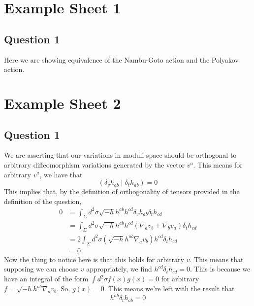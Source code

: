 \documentclass[11pt, oneside]{article}   	%
\theoremstyle{slanted}
\begin{document}
\section*{Example Sheet 1}

\subsection{Question 1}
Here we are showing equivalence 
of the Nambu-Goto action and the Polyakov action.
 

\pagebreak

\section{Example Sheet 2}

\subsection{Question 1}
We are asserting that 
our variations in moduli space should 
be orthogonal to arbitrary diffeomorphism 
variations generated by the vector $ v^ a  $. 
This means for arbitrary $ v ^ a  $, we 
have that 
\[
 \left( \delta _ v h _{ ab } \mid \delta _ t h _{ ab }  \right)   = 0
\] This implies that, by the definition of 
orthogonality of tensors provided in the definition of 
the question, 
\begin{align*}
	0 &=  \int_{ \Sigma } d ^ 2 \sigma \sqrt{ - h }  
	h ^{ ab } h ^{ cd } \delta _ v h _{ ab } \delta _ t h _{ cd} \\
	&=  \int_{ \Sigma } d ^ 2 \sigma \sqrt{ - h}  
	h ^{ ab } h ^{ cd } \left( \nabla _ a v _ b 
	+ \nabla _ b v _  a  \right)  \delta _ t h _{ cd } \\
	&=  2 \int _{ \Sigma  } d ^ 2 \sigma \left( 
	\sqrt{ -h }  h ^{ ab } \nabla _ a v _ b \right)  h ^{ cd } 
	\delta _ t h _{ cd }  \\
	&=  0 
\end{align*}
Now the thing to notice here is that 
this holds for arbitrary $ v $. This means that 
supposing we can choose $ v $ appropriately, we find 
$ h ^{ cd } \delta _ t h _{ cd } = 0 $.
This is because we have an integral 
of the form $ \int d ^ 2 \sigma f \left(  x  \right)  g \left( x  \right)    =0   $ 
for arbitrary $ f = \sqrt{ -h }  h ^{ ab } \nabla _ a v _ b  $.
So, $ g \left(  x  \right)   =0 $. This means 
we're left with the result that 
\[
 h ^{ ab } \delta _ t h _{ ab }  = 0 
\] 
\end{document}
